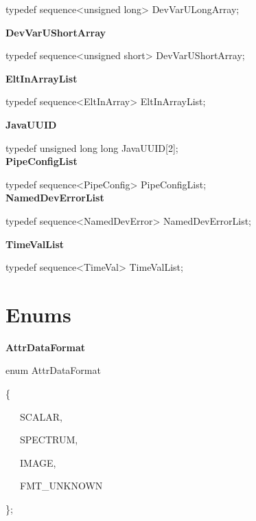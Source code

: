 typedef sequence<unsigned long> DevVarULongArray;\\

\begin{flushleft}
\textbf{DevVarUShortArray}
\par\end{flushleft}

typedef sequence<unsigned short> DevVarUShortArray;\\

\begin{flushleft}
\textbf{EltInArrayList}
\par\end{flushleft}

typedef sequence<EltInArray> EltInArrayList;\textbf{}\\

\begin{flushleft}
\textbf{JavaUUID}
\par\end{flushleft}

typedef unsigned long long JavaUUID{[}2{]};\\

\textbf{PipeConfigList}

typedef sequence<PipeConfig> PipeConfigList;\\

\textbf{NamedDevErrorList}

typedef sequence<NamedDevError> NamedDevErrorList;\\

\begin{flushleft}
\textbf{TimeValList}
\par\end{flushleft}

typedef sequence<TimeVal> TimeValList;\textbf{}\\


\section{Enums}

\textbf{AttrDataFormat}

enum AttrDataFormat

\{

~~~SCALAR,

~~~SPECTRUM,

~~~IMAGE,

~~~FMT\_UNKNOWN

\};\\

